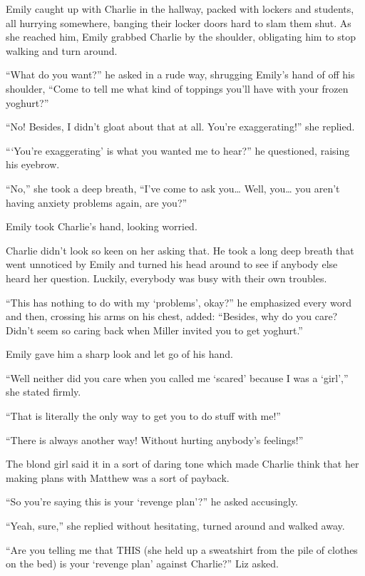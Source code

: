   Emily caught up with Charlie in the hallway, packed with lockers and students, all hurrying somewhere, banging their locker doors hard to slam them shut. As she reached him, Emily grabbed Charlie by the shoulder, obligating him to stop walking and turn around.

“What do you want?” he asked in a rude way, shrugging Emily’s hand of off his shoulder, “Come to tell me what kind of toppings you’ll have with your frozen yoghurt?”

“No! Besides, I didn’t gloat about that at all. You’re exaggerating!” she replied.

“‘You’re exaggerating’ is what you wanted me to hear?” he questioned, raising his eyebrow.

“No,” she took a deep breath, “I’ve come to ask you… Well, you… you aren’t having anxiety problems again, are you?”

Emily took Charlie’s hand, looking worried.

Charlie didn’t look so keen on her asking that. He took a long deep breath that went unnoticed by Emily and turned his head around to see if anybody else heard her question. Luckily, everybody was busy with their own troubles.

“This has nothing to do with my ‘problems’, okay?” he emphasized every word and then, crossing his arms on his chest, added: “Besides, why do you care? Didn’t seem so caring back when Miller invited you to get yoghurt.”

Emily gave him a sharp look and let go of his hand.

“Well neither did you care when you called me ‘scared’ because I was a ‘girl’,” she stated firmly.

“That is literally the only way to get you to do stuff with me!”

“There is always another way! Without hurting anybody’s feelings!”

The blond girl said it in a sort of daring tone which made Charlie think that her making plans with Matthew was a sort of payback.

“So you’re saying this is your ‘revenge plan’?” he asked accusingly.

“Yeah, sure,” she replied without hesitating, turned around and walked away.

\bigskip

“Are you telling me that THIS (she held up a sweatshirt from the pile of clothes on the bed) is your ‘revenge plan’ against Charlie?” Liz asked.

